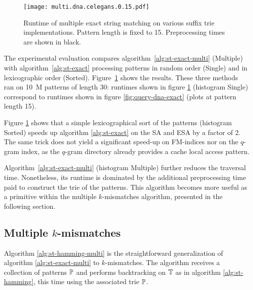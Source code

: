 \begin{figure}[b]
\begin{center}
\caption[Multiple exact string matching runtime]{Runtime of multiple exact string matching on various suffix trie implementations. Pattern length is fixed to 15. Preprocessing times are shown in black.}
\label{fig:query-dna-exact-multi}
\texttt{[image: multi.dna.celegans.0.15.pdf]}
\end{center}
\end{figure}

The experimental evaluation compares algorithm~\ref{alg:st-exact-multi} (Multiple) with algorithm~\ref{alg:st-exact} processing patterns in random order (Single) and in lexicographic order (Sorted).
Figure~\ref{fig:query-dna-exact-multi} shows the results.
These three methods ran on 10~M patterns of length 30: runtimes shown in figure \ref{fig:query-dna-exact-multi} (histogram Single) correspond to runtimes shown in figure \ref{fig:query-dna-exact} (plots at pattern length 15).

Figure \ref{fig:query-dna-exact-multi} shows that a simple lexicographical sort of the patterns (histogram Sorted) speeds up algorithm \ref{alg:st-exact} on the SA and ESA by a factor of 2.
The same trick does not yield a significant speed-up on FM-indices nor on the $q$-gram index, as the $q$-gram directory already provides a cache local access pattern.

Algorithm~\ref{alg:st-exact-multi} (histogram Multiple) further reduces the traversal time.
Nonetheless, its runtime is dominated by the additional preprocessing time paid to construct the trie of the patterns.
This algorithm becomes more useful as a primitive within the multiple $k$-mismatches algorithm, presented in the following section.

\subsection{Multiple $k$-mismatches}
\label{sec:index:algo:multimismatch}

Algorithm \ref{alg:st-hamming-multi} is the straightforward generalization of algorithm \ref{alg:st-exact-multi} to $k$-mismatches.
The algorithm receives a collection of patterns $\mathbb{P}$ and performs backtracking on $\mathbb{T}$ as in algorithm  \ref{alg:st-hamming}, this time using the associated trie $\mathbb{P}$.

